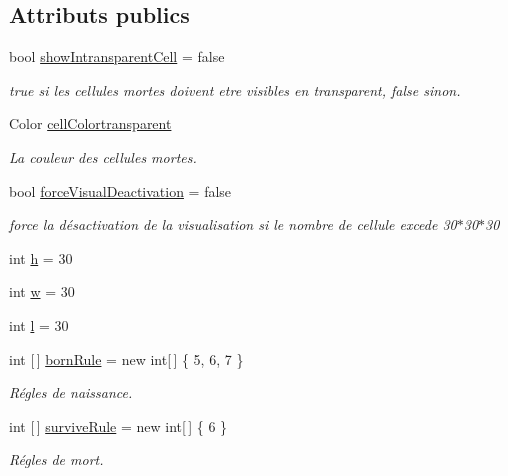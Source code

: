 \subsection*{Attributs publics}
\begin{DoxyCompactItemize}
\item 
bool \mbox{\hyperlink{class_simulation2_a0a82650af5163435eb703b67df1407fb}{show\+Intransparent\+Cell}} = false
\begin{DoxyCompactList}\small\item\em true si les cellules mortes doivent etre visibles en transparent, false sinon. \end{DoxyCompactList}\item 
Color \mbox{\hyperlink{class_simulation2_a79dc4cff4a20f5e7f32f56a3f636f264}{cell\+Colortransparent}}
\begin{DoxyCompactList}\small\item\em La couleur des cellules mortes. \end{DoxyCompactList}\item 
bool \mbox{\hyperlink{class_simulation2_a2d6fba893f6adaf94a2329d903a4ec35}{force\+Visual\+Deactivation}} = false
\begin{DoxyCompactList}\small\item\em force la désactivation de la visualisation si le nombre de cellule excede 30$\ast$30$\ast$30 \end{DoxyCompactList}\item 
int \mbox{\hyperlink{class_simulation2_af29275bd4a0258f40145571332bcbfe7}{h}} = 30
\item 
int \mbox{\hyperlink{class_simulation2_a2c5f8ea5bdf25da6011b47228df3fbf8}{w}} = 30
\item 
int \mbox{\hyperlink{class_simulation2_a3c066b4b23080953fcce80b1fc2c56b4}{l}} = 30
\item 
int \mbox{[}$\,$\mbox{]} \mbox{\hyperlink{class_simulation2_a4cb820ddd8658778f36723fa0e5dec50}{born\+Rule}} = new int\mbox{[}$\,$\mbox{]} \{ 5, 6, 7 \}
\begin{DoxyCompactList}\small\item\em Régles de naissance. \end{DoxyCompactList}\item 
int \mbox{[}$\,$\mbox{]} \mbox{\hyperlink{class_simulation2_a8e264ac14adf969b72d37a3006c9981f}{survive\+Rule}} = new int\mbox{[}$\,$\mbox{]} \{ 6 \}
\begin{DoxyCompactList}\small\item\em Régles de mort. \end{DoxyCompactList}\item 

\end{DoxyCompactItemize}
